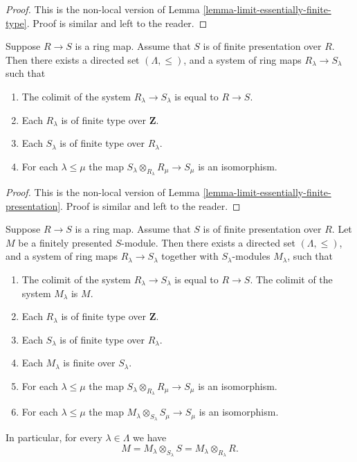 \begin{proof}
This is the non-local version of
Lemma \ref{lemma-limit-essentially-finite-type}.
Proof is similar and left to the reader.
\end{proof}

\begin{lemma}
\label{lemma-limit-finite-presentation}
Suppose $R \to S$ is a ring map.
Assume that $S$ is of finite presentation over $R$.
Then there exists a directed set $(\Lambda, \leq)$, and
a system of ring maps $R_\lambda \to S_\lambda$
such that
\begin{enumerate}
\item The colimit of the system $R_\lambda \to S_\lambda$
is equal to $R \to S$.
\item Each $R_\lambda$ is of finite type
over $\mathbf{Z}$.
\item Each $S_\lambda$ is of finite type
over $R_\lambda$.
\item For each $\lambda \leq \mu$ the map
$S_\lambda \otimes_{R_\lambda} R_\mu \to S_\mu$
is an isomorphism.
\end{enumerate}
\end{lemma}

\begin{proof}
This is the non-local version of
Lemma \ref{lemma-limit-essentially-finite-presentation}.
Proof is similar and left to the reader.
\end{proof}

\begin{lemma}
\label{lemma-limit-module-finite-presentation}
Suppose $R \to S$ is a ring map.
Assume that $S$ is of finite presentation over $R$.
Let $M$ be a finitely presented $S$-module.
Then there exists a directed set $(\Lambda, \leq)$, and
a system of ring maps $R_\lambda \to S_\lambda$
together with $S_\lambda$-modules $M_\lambda$,
such that
\begin{enumerate}
\item The colimit of the system $R_\lambda \to S_\lambda$
is equal to $R \to S$. The colimit of the system $M_\lambda$
is $M$.
\item Each $R_\lambda$ is of finite type
over $\mathbf{Z}$.
\item Each $S_\lambda$ is of finite type
over $R_\lambda$.
\item Each $M_\lambda$ is finite over $S_\lambda$.
\item For each $\lambda \leq \mu$ the map
$S_\lambda \otimes_{R_\lambda} R_\mu \to S_\mu$
is an isomorphism.
\item For each $\lambda \leq \mu$ the map
$M_\lambda \otimes_{S_\lambda} S_\mu \to S_\mu$
is an isomorphism.
\end{enumerate}
In particular, for every $\lambda \in \Lambda$ we have
$$
M = M_\lambda \otimes_{S_\lambda} S
= M_\lambda \otimes_{R_\lambda} R.
$$
\end{lemma}

